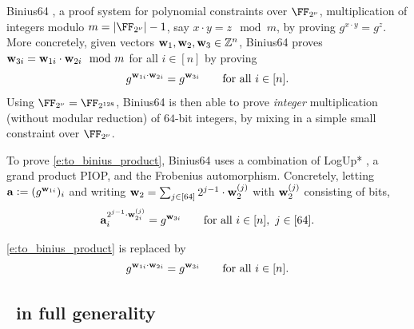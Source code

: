 \documentclass[11pt,letterpaper,usenames,dvipsnames]{article}
\begin{document}
    Binius64 \cite{?}, a proof system for polynomial constraints over $\comfield$,  multiplication of integers modulo $m=|\comfield|-1$, say $x\cdot y = z \mod m$,  by proving $g^{x\cdot y} = g^z$. More concretely, given vectors $\mathbf{w}_1,\mathbf{w}_2,\mathbf{w}_3\in \mathbb{Z}^n$, Binius64 proves $\mathbf{w}_{3i}= \mathbf{w}_{1i}\cdot \mathbf{w}_{2i} \mod m$ for all $i\in [n]$ by proving \begin{equation}\label{e:to_binius_product}g^{\mathbf{w}_{1i}\cdot \mathbf{w}_{2i}} = g^{\mathbf{w}_{3i}} \qquad \text{for all } i\in [n].\end{equation} Using $\comfield=\FF_{2^{128}}$, Binius64  is then able to prove \emph{integer} multiplication (without modular reduction) of $64$-bit integers, by mixing in a simple small constraint over $\comfield$. 


    To prove \eqref{e:to_binius_product}, Binius64 uses a combination of LogUp* \cite{*}, a grand product PIOP, and the Frobenius automorphism. Concretely,  letting $\mathbf{a} {\;\vcentcolon=\;} ( g^{\mathbf{w}_{1i}})_i$ and writing $\mathbf{w}_2=\sum_{j\in [64]} 2^{j-1} \cdot \mathbf{w}_2^{(j)}$ with $\mathbf{w}_2^{(j)}$ consisting of bits, 
    \begin{equation}\label{e:to_binius_product}\mathbf{a}_i^{2^{j-1}\cdot \mathbf{w}_{2i}^{(j)}} = g^{\mathbf{w}_{3i}} \qquad \text{for all } i\in [n], \ j\in [64].\end{equation}
    
    \eqref{e:to_binius_product} is replaced by 
    \begin{equation}\label{e:to_binius_product}g^{\mathbf{w}_{1i}\cdot \mathbf{w}_{2i}} = g^{\mathbf{w}_{3i}} \qquad \text{for all } i\in [n].\end{equation}
    

\subsection{\ftwoz\  in full generality}





\end{document}
